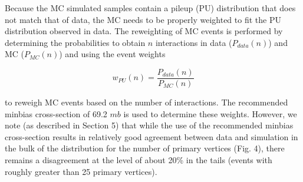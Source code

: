 Because the MC simulated samples contain a pileup (PU) distribution that does not match that of data, 
the MC needs to be properly weighted to fit the PU distribution observed in data. The reweighting 
of MC events is performed by determining the probabilities to obtain $n$ interactions in data 
($P_{data}(n)$) and MC ($P_{MC}(n)$) and using the event weights

\begin{equation}
   w_{PU}(n) = \frac{P_{data}(n)}{P_{MC}(n)}
\label{eq:PUweight}
\end{equation}

to reweigh MC events based on the number of interactions. The recommended minbias cross-section of 69.2 $mb$ is used to determine these weights. 
However, we note (as described in Section 5) that while the use of the recommended minbias cross-section results in relatively good agreement between data 
and simulation in the bulk of the distribution for the number of primary vertices (Fig. 4), there remains a disagreement at the level of about 20\% 
in the tails (events with roughly greater than 25 primary vertices).
